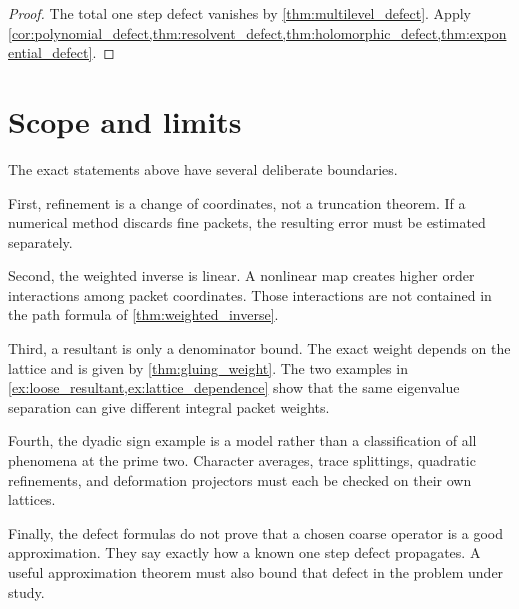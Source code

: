 \documentclass{aomart}
\theoremstyle{definition}
\theoremstyle{remark}
\begin{document}
\begin{proof}
The total one step defect vanishes by \cref{thm:multilevel_defect}.  Apply \cref{cor:polynomial_defect,thm:resolvent_defect,thm:holomorphic_defect,thm:exponential_defect}.
\end{proof}

\section{Scope and limits}\label{sec:limits}

The exact statements above have several deliberate boundaries.

First, refinement is a change of coordinates, not a truncation theorem.  If a numerical method discards fine packets, the resulting error must be estimated separately.

Second, the weighted inverse is linear.  A nonlinear map creates higher order interactions among packet coordinates.  Those interactions are not contained in the path formula of \cref{thm:weighted_inverse}.

Third, a resultant is only a denominator bound.  The exact weight depends on the lattice and is given by \cref{thm:gluing_weight}.  The two examples in \cref{ex:loose_resultant,ex:lattice_dependence} show that the same eigenvalue separation can give different integral packet weights.

Fourth, the dyadic sign example is a model rather than a classification of all phenomena at the prime two.  Character averages, trace splittings, quadratic refinements, and deformation projectors must each be checked on their own lattices.

Finally, the defect formulas do not prove that a chosen coarse operator is a good approximation.  They say exactly how a known one step defect propagates.  A useful approximation theorem must also bound that defect in the problem under study.




\end{document}
